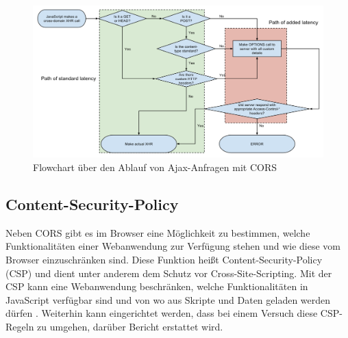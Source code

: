 \begin{figure}[H]
	\centering
	\includegraphics[width=\linewidth]{img/02_theorie/1280px-Flowchart_showing_Simple_and_Preflight_XHR.svg.png}
	\caption{Flowchart über den Ablauf von Ajax-Anfragen mit CORS \cite{FlowchartCORS}}
	\label{fig:cors-workflow}
\end{figure}

\subsection{Content-Security-Policy}


Neben CORS gibt es im Browser eine Möglichkeit zu bestimmen, welche Funktionalitäten einer Webanwendung zur Verfügung stehen und wie diese vom Browser einzuschränken sind. Diese Funktion heißt Content-Security-Policy (CSP) und dient unter anderem dem Schutz vor Cross-Site-Scripting. Mit der CSP kann eine Webanwendung beschränken, welche Funktionalitäten in JavaScript verfügbar sind und von wo aus Skripte und Daten geladen werden dürfen \cite{MDNContentSecurityPolicy}. Weiterhin kann eingerichtet werden, dass bei einem Versuch diese CSP-Regeln zu umgehen, darüber Bericht erstattet wird.